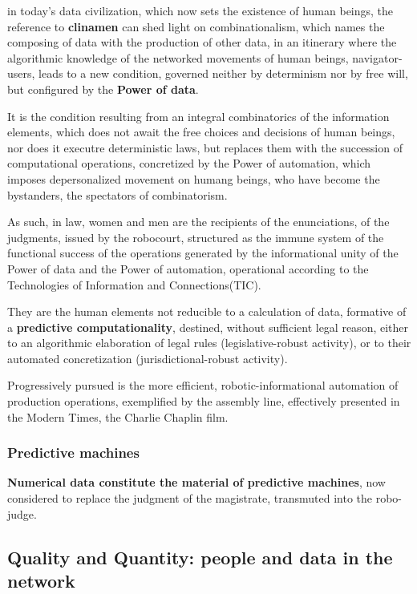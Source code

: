 in today's data civilization, which now sets the existence of human beings, the reference to \textbf{clinamen}
can shed light on combinationalism, which names the composing of data with the production of other data,
in an itinerary where the algorithmic knowledge of the networked movements of human beings, navigator-users,
leads to a new condition, governed neither by determinism nor by free will, but configured by the \textbf{Power of data}.

It is the condition resulting from an integral combinatorics of the information elements, which does not await
the free choices and decisions of human beings, nor does it executre deterministic laws, but replaces
them with the succession of computational operations, concretized by the Power of automation, which imposes
depersonalized movement on humang beings, who have become the bystanders, the spectators of combinatorism.

As such, in law, women and men are the recipients of the enunciations, of the judgments, issued by the robocourt,
structured as the immune system of the functional success of the operations generated by the informational unity
of the Power of data and the Power of automation, operational according to the Technologies of Information and Connections(TIC).

They are the human elements not reducible to a calculation of data, formative of a \textbf{predictive computationality}, 
destined, without sufficient legal reason, either to an algorithmic elaboration of legal rules (legislative-robust activity), or
to their automated concretization (jurisdictional-robust activity).

\begin{note}
    Progressively pursued is the more efficient, robotic-informational automation of production operations, exemplified
    by the assembly line, effectively presented in the Modern Times, the Charlie Chaplin film.
\end{note}

\subsubsection{Predictive machines}

\textbf{Numerical data constitute the material of predictive machines}, now considered to replace the judgment
of the magistrate, transmuted into the robo-judge.

\subsection{Quality and Quantity: people and data in the network}

